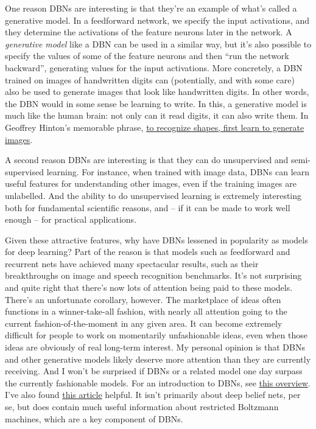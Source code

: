 \documentclass[a4paper,twoside,10pt]{book}
\begin{document}
One reason DBNs are interesting is that they're an example of what's called a generative model. In a feedforward network, we specify the input activations, and they determine the activations of the feature neurons later in the network. A \textit{generative model} like a DBN can be used in a similar way, but it's also possible to specify the values of some of the feature neurons and then ``run the network backward'', generating values for the input activations. More concretely, a DBN trained on images of handwritten digits can (potentially, and with some care) also be used to generate images that look like handwritten digits. In other words, the DBN would in some sense be learning to write. In this, a generative model is much like the human brain: not only can it read digits, it can also write them. In Geoffrey Hinton's memorable phrase, \href{http://www.sciencedirect.com/science/article/pii/S0079612306650346}{to recognize shapes, first learn to generate images}.

A second reason DBNs are interesting is that they can do unsupervised and semi-supervised learning. For instance, when trained with image data, DBNs can learn useful features for understanding other images, even if the training images are unlabelled. And the ability to do unsupervised learning is extremely interesting both for fundamental scientific reasons, and -- if it can be made to work well enough -- for practical applications.

Given these attractive features, why have DBNs lessened in popularity as models for deep learning? Part of the reason is that models such as feedforward and recurrent nets have achieved many spectacular results, such as their breakthroughs on image and speech recognition benchmarks. It's not surprising and quite right that there's now lots of attention being paid to these models. There's an unfortunate corollary, however. The marketplace of ideas often functions in a winner-take-all fashion, with nearly all attention going to the current fashion-of-the-moment in any given area. It can become extremely difficult for people to work on momentarily unfashionable ideas, even when those ideas are obviously of real long-term interest. My personal opinion is that DBNs and other generative models likely deserve more attention than they are currently receiving. And I won't be surprised if DBNs or a related model one day surpass the currently fashionable models. For an introduction to DBNs, see \href{http://www.scholarpedia.org/article/Deep_belief_networks}{this overview}. I've also found \href{http://www.cs.toronto.edu/~hinton/absps/guideTR.pdf}{this article} helpful. It isn't primarily about deep belief nets, per se, but does contain much useful information about restricted Boltzmann machines, which are a key component of DBNs.
\end{document}
